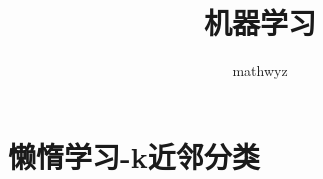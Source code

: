 \documentclass{amsart}
\title{机器学习}
\date{}
\author{mathwyz}
\begin{document}
\maketitle
\tableofcontents

\section{懒惰学习-k近邻分类}
\end{document}
